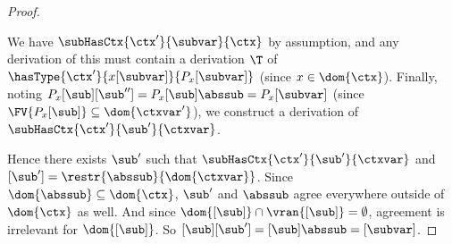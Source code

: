\begin{proof}
\begin{itemize}
  We have $\subHasCtx{\ctx'}{\subvar}{\ctx}$ by assumption, and any derivation of this must contain a derivation $\T$ of $\hasType{\ctx'}{x[\subvar]}{P_x[\subvar]}$ (since $x \in \dom{\ctx}$).
  Finally, noting $P_x[\sub][\sub''] = P_x[\sub]\abssub = P_x[\subvar]$ (since $\FV{P_x[\sub]} \subseteq \dom{\ctxvar'}$), we construct a derivation of $\subHasCtx{\ctx'}{\sub'}{\ctxvar}$.
  \begin{prooftree}
  \end{prooftree}
\end{itemize}
Hence there exists $\sub'$ such that $\subHasCtx{\ctx'}{\sub'}{\ctxvar}$ and $[\sub'] = \restr{\abssub}{\dom{\ctxvar}}$.
Since $\dom{\abssub} \subseteq \dom{\ctx}$, $\sub'$ and $\abssub$ agree everywhere outside of $\dom{\ctx}$ as well.
And since $\dom{[\sub]} \cap \vran{[\sub]} = \emptyset$, agreement is irrelevant for $\dom{[\sub]}$.
So $[\sub][\sub'] = [\sub]\abssub = [\subvar]$.
\end{proof}

